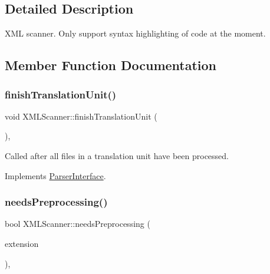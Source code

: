\subsection{Detailed Description}
X\+ML scanner. Only support syntax highlighting of code at the moment. 

\subsection{Member Function Documentation}
\mbox{\label{class_x_m_l_scanner_a00b3082e888d6bd670fdc31e52b79606}} 
\subsubsection{\texorpdfstring{finishTranslationUnit()}{finishTranslationUnit()}}
{\footnotesize\ttfamily void X\+M\+L\+Scanner\+::finish\+Translation\+Unit (\begin{DoxyParamCaption}{ }\end{DoxyParamCaption})\hspace{0.3cm}{\ttfamily [inline]}, {\ttfamily [virtual]}}

Called after all files in a translation unit have been processed. 

Implements \mbox{\hyperlink{class_parser_interface_af3acd64c6a33852e2e46e7288eb9c9cf}{Parser\+Interface}}.

\mbox{\label{class_x_m_l_scanner_aee7d6327a9e55cd3b965a21f707ed0a5}} 
\subsubsection{\texorpdfstring{needsPreprocessing()}{needsPreprocessing()}}
{\footnotesize\ttfamily bool X\+M\+L\+Scanner\+::needs\+Preprocessing (\begin{DoxyParamCaption}\item[{const \mbox{\hyperlink{class_q_c_string}{Q\+C\+String}} \&}]{extension }\end{DoxyParamCaption})\hspace{0.3cm}{\ttfamily [inline]}, {\ttfamily [virtual]}}

